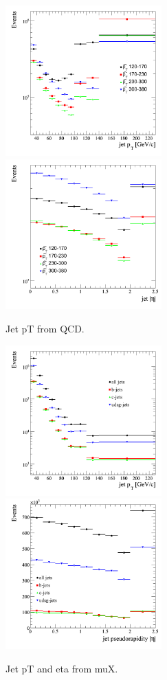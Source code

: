 \begin{figure}[htbp]
  \begin{center}
    \includegraphics[width=60mm]{Figures/jet_pt2qcdbinned.png}
    \includegraphics[width=60mm]{Figures/jet_eta_qcdbinned2.png}
  \end{center}
  \caption{Jet pT from QCD.}
  \label{fig:jet_pt_QCD2}
\end{figure}

\begin{figure}[htbp]
  \begin{center}
    \includegraphics[width=60mm]{Figures/jet_pt_muX.png}
    \includegraphics[width=60mm]{Figures/jet_eta_muX.png}
  \end{center}
  \caption{Jet pT and eta from muX.}
  \label{fig:jet_pt_QCD}
\end{figure}

